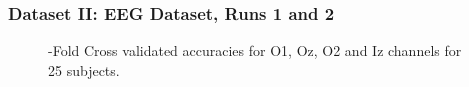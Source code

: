 \documentclass[11pt]{beamer}
\begin{document}
    \begin{frame}
    \frametitle{Dataset II: EEG Dataset, Runs 1 and 2 }
   \begin{figure}[thpb]
      \centering
      \setlength\fboxsep{0pt}
	  \setlength\fboxrule{0.5pt}
      \caption{-Fold Cross validated accuracies for O1, Oz, O2 and Iz channels for 25 subjects.}
      \label{figure2}
   \end{figure}          
    \end{frame}            
        
    
    
\end{document}
